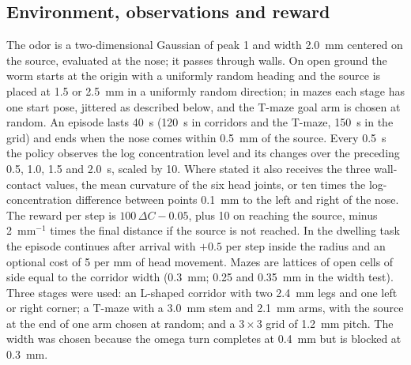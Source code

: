 \documentclass[11pt,a4paper]{article}
\begin{document}
\subsection*{Environment, observations and reward}
The odor is a two-dimensional Gaussian of peak 1 and width 2.0~mm centered on the source, evaluated at the nose; it passes through walls. On open ground the worm starts at the origin with a uniformly random heading and the source is placed at 1.5 or 2.5~mm in a uniformly random direction; in mazes each stage has one start pose, jittered as described below, and the T-maze goal arm is chosen at random. An episode lasts 40~s (120~s in corridors and the T-maze, 150~s in the grid) and ends when the nose comes within 0.5~mm of the source. Every 0.5~s the policy observes the log concentration level and its changes over the preceding 0.5, 1.0, 1.5 and 2.0~s, scaled by 10. Where stated it also receives the three wall-contact values, the mean curvature of the six head joints, or ten times the log-concentration difference between points 0.1~mm to the left and right of the nose. The reward per step is $100\,\Delta C - 0.05$, plus 10 on reaching the source, minus 2~mm$^{-1}$ times the final distance if the source is not reached. In the dwelling task the episode continues after arrival with $+0.5$ per step inside the radius and an optional cost of 5 per mm of head movement. Mazes are lattices of open cells of side equal to the corridor width (0.3~mm; 0.25 and 0.35~mm in the width test). Three stages were used: an L-shaped corridor with two 2.4~mm legs and one left or right corner; a T-maze with a 3.0~mm stem and 2.1~mm arms, with the source at the end of one arm chosen at random; and a $3\times3$ grid of 1.2~mm pitch. The width was chosen because the omega turn completes at 0.4~mm but is blocked at 0.3~mm.
\end{document}
